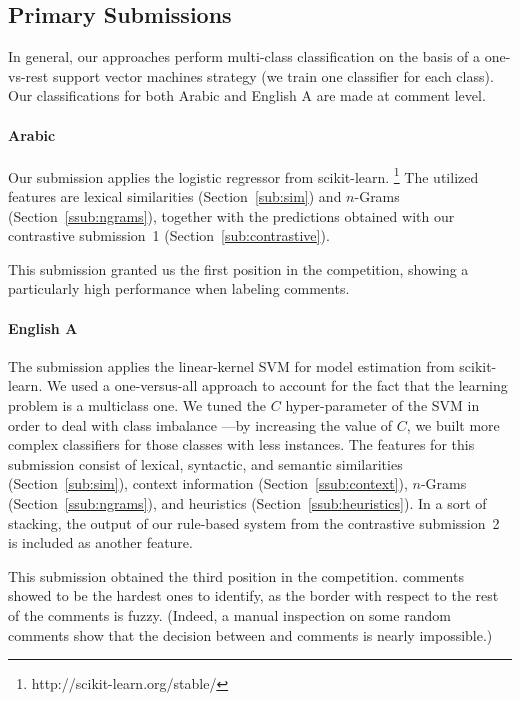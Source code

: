\subsection{Primary Submissions}

In general, our approaches perform multi-class classification on the basis of a 
one-vs-rest support vector machines strategy (\ie we train one classifier for 
each class). Our classifications for both Arabic and English A are made at 
comment level.


\paragraph{Arabic} Our submission applies the logistic regressor from 
scikit-learn.%
\footnote{http://scikit-learn.org/stable/}
The utilized features are lexical similarities (Section~\ref{sub:sim}) and  
$n$-Grams (Section~\ref{ssub:ngrams}), together with the predictions obtained 
with our contrastive submission~1 (\cf Section~\ref{sub:contrastive}). 

This submission granted us the first position in the competition, showing a 
particularly high performance when labeling \rel comments.

\paragraph{English A}
The submission applies the linear-kernel SVM for model estimation from 
scikit-learn. We used a one-versus-all approach to account for the fact that 
the learning problem is a multiclass one. We tuned the $C$ hyper-parameter of 
the SVM in order to deal with class imbalance ---by increasing the value of 
$C$, we built more complex classifiers for those classes with less instances. 
% 
The features for this submission consist of lexical, syntactic, and semantic 
similarities (Section~\ref{sub:sim}), context information 
(Section~\ref{ssub:context}), 
$n$-Grams (Section~\ref{ssub:ngrams}), and heuristics 
(Section~\ref{ssub:heuristics}). In a sort of stacking, the output of our 
rule-based system from the contrastive submission~2 is included as another 
feature. 

This submission obtained the third position in the competition. \pot comments 
showed to be the hardest ones to identify, as the border with 
respect to the rest of the comments is fuzzy. (Indeed, a manual inspection on some 
random comments show that the decision between \good and \pot comments is nearly 
impossible.)

